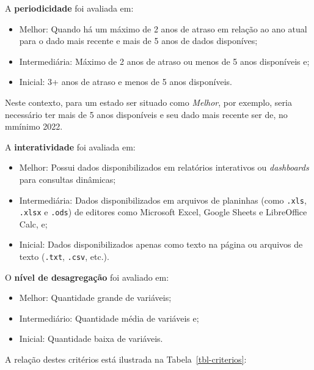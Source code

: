 \documentclass[
  a4paper,
]{article}
\begin{document}
A \textbf{periodicidade} foi avaliada em:

\begin{itemize}
\item
  Melhor: Quando há um máximo de 2 anos de atraso em relação ao ano
  atual para o dado mais recente e mais de 5 anos de dados disponíves;
\item
  Intermediária: Máximo de 2 anos de atraso ou menos de 5 anos
  disponíveis e;
\item
  Inicial: 3+ anos de atraso e menos de 5 anos disponíveis.
\end{itemize}

Neste contexto, para um estado ser situado como \emph{Melhor}, por
exemplo, seria necessário ter mais de 5 anos disponíveis e seu dado mais
recente ser de, no mmínimo 2022.

A \textbf{interatividade} foi avaliada em:

\begin{itemize}
\item
  Melhor: Possui dados disponibilizados em relatórios interativos ou
  \emph{dashboards} para consultas dinâmicas;
\item
  Intermediária: Dados disponibilizados em arquivos de planinhas (como
  \texttt{.xls}, \texttt{.xlsx} e \texttt{.ods}) de editores como
  Microsoft Excel, Google Sheets e LibreOffice Calc, e;
\item
  Inicial: Dados disponibilizados apenas como texto na página ou
  arquivos de texto (\texttt{.txt}, \texttt{.csv}, etc.).
\end{itemize}

O \textbf{nível de desagregação} foi avaliado em:

\begin{itemize}
\item
  Melhor: Quantidade grande de variáveis;
\item
  Intermediário: Quantidade média de variáveis e;
\item
  Inicial: Quantidade baixa de variáveis.
\end{itemize}

A relação destes critérios está ilustrada na Tabela~\ref{tbl-criterios}:

\break
\end{document}

